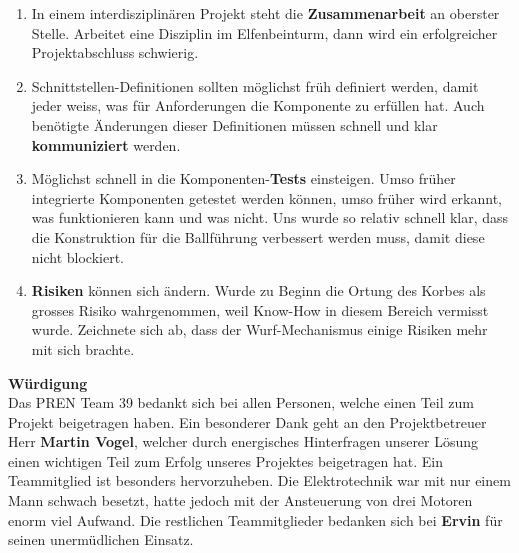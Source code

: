 \begin{enumerate}
	\item  In einem interdisziplinären Projekt steht die \textbf{Zusammenarbeit} an oberster Stelle. Arbeitet eine Disziplin im Elfenbeinturm, dann wird ein erfolgreicher Projektabschluss schwierig.
	\item Schnittstellen-Definitionen sollten möglichst früh definiert werden, damit jeder weiss, was für Anforderungen die Komponente zu erfüllen hat. Auch benötigte Änderungen dieser Definitionen müssen schnell und klar \textbf{kommuniziert} werden.
	\item Möglichst schnell in die Komponenten-\textbf{Tests} einsteigen. Umso früher integrierte Komponenten getestet werden können, umso früher wird erkannt, was funktionieren kann und was nicht. Uns wurde so relativ schnell klar, dass die Konstruktion für die Ballführung verbessert werden muss, damit diese nicht blockiert.
	\item \textbf{Risiken} können sich ändern. Wurde zu Beginn die Ortung des Korbes als grosses Risiko wahrgenommen, weil Know-How in diesem Bereich vermisst wurde. Zeichnete sich ab, dass der Wurf-Mechanismus einige Risiken mehr mit sich brachte.
\end{enumerate}

\noindent
\textbf{Würdigung}
\\
Das PREN Team 39 bedankt sich bei allen Personen, welche einen Teil zum Projekt beigetragen haben. Ein besonderer Dank geht an den Projektbetreuer Herr \textbf{Martin Vogel}, welcher durch energisches Hinterfragen unserer Lösung einen wichtigen Teil zum Erfolg unseres Projektes beigetragen hat. Ein Teammitglied ist besonders hervorzuheben. Die Elektrotechnik war mit nur einem Mann schwach besetzt, hatte jedoch mit der Ansteuerung von drei Motoren enorm viel Aufwand. Die restlichen Teammitglieder bedanken sich bei \textbf{Ervin} für seinen unermüdlichen Einsatz.